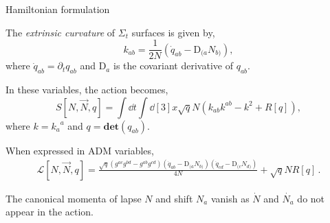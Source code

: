 \documentclass[12pt,titlepage]{article}
\begin{document}
\begin{frame}{Hamiltonian formulation}
    \begin{list}{\,}{\leftmargin=1em \itemindent=0em}
        \item<1-> The \textit{extrinsic curvature} of $\Sigma_t$ surfaces is given by,
        \begin{equation}
            k_{ab}=\frac{1}{2N}\left(\dot{q}_{ab}-\text{D}_{(a}N_{b)}\right),
        \end{equation}
        where $\dot{q}_{ab}=\partial_t q_{ab}$ and $\text{D}_{a}$ is the covariant derivative of $q_{ab}$.
        \item<2-> In these variables, the action becomes,
        \begin{equation}
            S[N,\vec{N},q]=\int\dd{t}\int\dd[3]{x}\sqrt{q}N\left(k_{ab}k^{ab}-k^2+R[q]\right),
        \end{equation}
        where $k={k_a}^a$ and $q=\mathbf{det}(q_{ab})$.
        \item<3-> When expressed in ADM variables,
        \begin{multline}
            \mathcal{L}[N,\vec{N},q]=\frac{\sqrt{q}\left({g}^{ac}{g}^{bd}-{g}^{ab}{g}^{cd}\right)\left(\dot{q}_{ab}-\text{D}_{(a}N_{b)}\right)\left(\dot{q}_{cd}-\text{D}_{(c}N_{d)}\right)}{4N}+\sqrt{q}NR[q]\,.
        \end{multline}
        \item<4-> The canonical momenta of lapse $N$ and shift $N_a$ vanish as $\dot{N}$ and $\dot{N_a}$ do not appear in the action.
    \end{list}
\end{frame}
\end{document}
